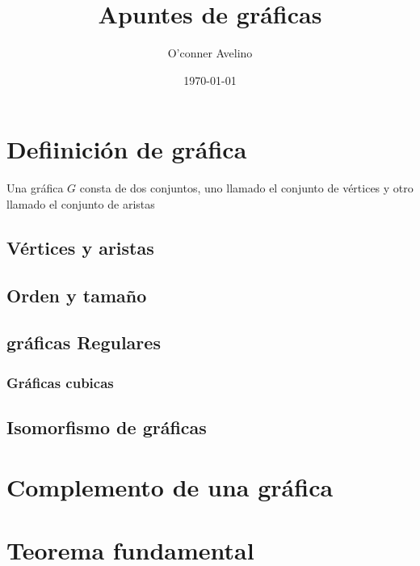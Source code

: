 \documentclass[11pt]{article}
\author{O'conner Avelino}
\date{\today}
\title{Apuntes de gráficas}
\begin{document}
\maketitle
\tableofcontents


\section{Defiinición de gráfica}
\label{sec:orge948146}

Una gráfica \(G\) consta de dos conjuntos, uno llamado el conjunto de
vértices y otro llamado el conjunto de aristas

\subsection{Vértices y aristas}
\label{sec:orgafe5795}

\subsection{Orden y tamaño}
\label{sec:orgfe3ad20}

\subsection{gráficas Regulares}
\label{sec:orgab2ec5c}

\subsubsection{Gráficas cubicas}
\label{sec:orgb092473}

\subsection{Isomorfismo de gráficas}
\label{sec:org483dccc}

\section{Complemento de una gráfica}
\label{sec:orgb0f45cb}

\section{Teorema fundamental}
\label{sec:org01672b5}
\end{document}
